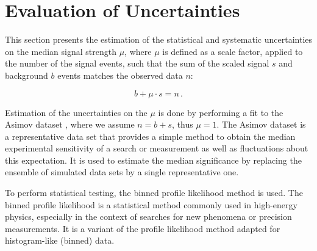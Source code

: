\chapter{Evaluation of Uncertainties}
\label{ch:Evaluation}

This section presents the estimation of the statistical and systematic uncertainties on the median signal strength
$\mu$, where $\mu$ is defined as a scale factor, applied to the number of the signal events, such that the sum of the scaled
signal $s$ and background $b$ events matches the observed data $n$:

\begin{equation}
    \label{eq:mu}
    b + \mu \cdot s = n\,.
\end{equation}


Estimation of the uncertainties on the $\mu$ is done by performing a fit to the Asimov dataset \cite{statistical}, where
we assume $n = b + s$, thus $\mu = 1$. The Asimov dataset is a representative data set that provides a
simple method to obtain the median experimental sensitivity of a search or measurement as well as fluctuations about
this expectation. It is used to estimate the median significance by replacing the ensemble of simulated data sets by a
single representative one.


To perform statistical testing, the binned profile likelihood method is used. The binned profile likelihood is a
statistical method commonly used in high-energy physics, especially in the context of searches for new phenomena or
precision measurements. It is a variant of the profile likelihood method adapted for histogram-like (binned) data.

